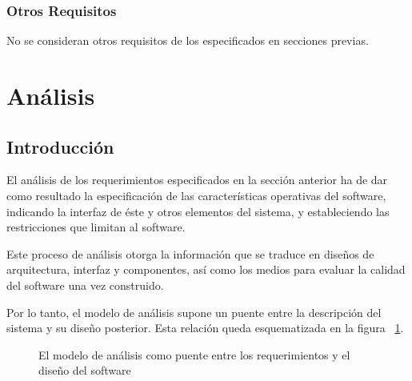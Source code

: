 \subsubsection{Otros Requisitos}

No se consideran otros requisitos de los especificados en secciones previas.



\section{Análisis}

\subsection{Introducción}

El análisis de los requerimientos especificados en la sección anterior ha de dar como resultado la especificación de las características operativas del software, indicando la interfaz de éste y otros elementos del sistema, y estableciendo las restricciones que limitan al software.

Este proceso de análisis otorga la información que se traduce en diseños de arquitectura, interfaz y componentes, así como los medios para evaluar la calidad del software una vez construido. 

Por lo tanto, el modelo de análisis supone un puente entre la descripción del sistema y su diseño posterior. Esta relación queda esquematizada en la figura ~\ref{fig:modeloAnalisis}.

\begin{figure}
	\centering
	\caption{El modelo de análisis como puente entre los requerimientos y el diseño del software}
	\label{fig:modeloAnalisis}
\end{figure}

